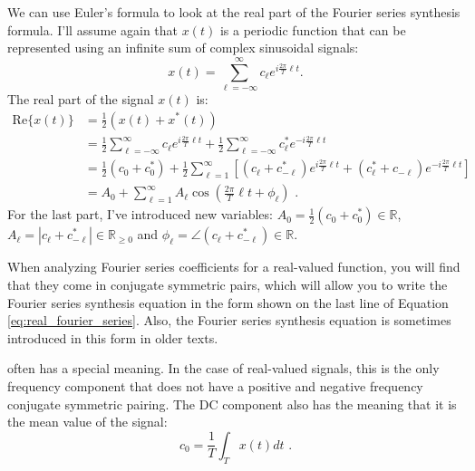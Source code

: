  We can use Euler's formula to look at
the real part of the Fourier series synthesis formula. I'll assume again that $x(t)$ is a
periodic function that can be represented using an infinite sum of complex sinusoidal signals:
\begin{equation}
  x(t) = \sum_{\ell = -\infty}^{\infty} c_{\ell} e^{i\frac{2\pi}{T}\ell t}.
\end{equation}
The real part of the signal $x(t)$ is:
\begin{align}
  \mathrm{Re}\{x(t)\} & = \frac{1}{2} (x(t) + x^*(t))                                                                                                                                             \\
                      & = \frac{1}{2}\sum_{\ell=-\infty}^{\infty} c_{\ell} e^{i\frac{2\pi}{T}\ell t} + \frac{1}{2}\sum_{\ell=-\infty}^{\infty} c^*_{\ell} e^{-i\frac{2\pi}{T}\ell t}              \\
                      & = \frac{1}{2}(c_0 + c_0^*) + \frac{1}{2}\sum_{\ell=1}^{\infty}[ (c_{\ell} + c^*_{-\ell}) e^{i\frac{2\pi}{T}\ell t} + (c^*_{\ell} + c_{-\ell}) e^{-i\frac{2\pi}{T}\ell t}] \\
                      & = A_0 + \sum_{\ell=1}^{\infty} A_\ell \cos\left(\frac{2\pi}{T}\ell t+\phi_\ell\right) \,\,.
  \label{eq:real_fourier_series}
\end{align}
For the last part, I've introduced new variables: $A_0= \frac{1}{2}(c_0 + c_0^*) \in \mathbb{R}$, $A_\ell = |c_{\ell} +c^*_{-\ell}|\in \mathbb{R}_{\ge 0}$ and $\phi_\ell = \angle (c_{\ell} + c^*_{-\ell}) \in \mathbb{R}$.

When analyzing Fourier series coefficients for a real-valued function, you will find that they come in conjugate symmetric pairs,
which will allow you to write the Fourier series synthesis equation in the form shown on the last
line of Equation \ref{eq:real_fourier_series}.
Also, the Fourier series synthesis equation is sometimes introduced in this form in older texts.

 often has a
special meaning. In the case of real-valued signals,
this is the only frequency component that does not have a positive and negative frequency conjugate
symmetric pairing. The DC component also has the meaning that it is the mean value of the signal:
\begin{equation}
  c_0 = \frac{1}{T} \int_{T} x(t) dt \,\,.
\end{equation}


